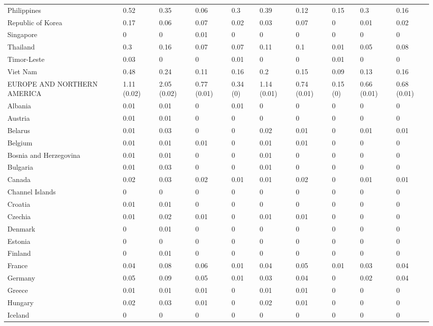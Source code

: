 \begin{longtable}[t]{llllllllll}
Philippines & 0.52 & 0.35 & 0.06 & 0.3 & 0.39 & 0.12 & 0.15 & 0.3 & 0.16\\
Republic of Korea & 0.17 & 0.06 & 0.07 & 0.02 & 0.03 & 0.07 & 0 & 0.01 & 0.02\\
Singapore & 0 & 0 & 0.01 & 0 & 0 & 0 & 0 & 0 & 0\\
Thailand & 0.3 & 0.16 & 0.07 & 0.07 & 0.11 & 0.1 & 0.01 & 0.05 & 0.08\\
Timor-Leste & 0.03 & 0 & 0 & 0.01 & 0 & 0 & 0.01 & 0 & 0\\
Viet Nam & 0.48 & 0.24 & 0.11 & 0.16 & 0.2 & 0.15 & 0.09 & 0.13 & 0.16\\
EUROPE AND NORTHERN AMERICA & 1.11 (0.02) & 2.05 (0.02) & 0.77 (0.01) & 0.34 (0) & 1.14 (0.01) & 0.74 (0.01) & 0.15 (0) & 0.66 (0.01) & 0.68 (0.01)\\
Albania & 0.01 & 0.01 & 0 & 0.01 & 0 & 0 & 0 & 0 & 0\\
Austria & 0.01 & 0.01 & 0 & 0 & 0 & 0 & 0 & 0 & 0\\
Belarus & 0.01 & 0.03 & 0 & 0 & 0.02 & 0.01 & 0 & 0.01 & 0.01\\
Belgium & 0.01 & 0.01 & 0.01 & 0 & 0.01 & 0.01 & 0 & 0 & 0\\
Bosnia and Herzegovina & 0.01 & 0.01 & 0 & 0 & 0.01 & 0 & 0 & 0 & 0\\
Bulgaria & 0.01 & 0.03 & 0 & 0 & 0.01 & 0 & 0 & 0 & 0\\
Canada & 0.02 & 0.03 & 0.02 & 0.01 & 0.01 & 0.02 & 0 & 0.01 & 0.01\\
Channel Islands & 0 & 0 & 0 & 0 & 0 & 0 & 0 & 0 & 0\\
Croatia & 0.01 & 0.01 & 0 & 0 & 0 & 0 & 0 & 0 & 0\\
Czechia & 0.01 & 0.02 & 0.01 & 0 & 0.01 & 0.01 & 0 & 0 & 0\\
Denmark & 0 & 0.01 & 0 & 0 & 0 & 0 & 0 & 0 & 0\\
Estonia & 0 & 0 & 0 & 0 & 0 & 0 & 0 & 0 & 0\\
Finland & 0 & 0.01 & 0 & 0 & 0 & 0 & 0 & 0 & 0\\
France & 0.04 & 0.08 & 0.06 & 0.01 & 0.04 & 0.05 & 0.01 & 0.03 & 0.04\\
Germany & 0.05 & 0.09 & 0.05 & 0.01 & 0.03 & 0.04 & 0 & 0.02 & 0.04\\
Greece & 0.01 & 0.01 & 0.01 & 0 & 0.01 & 0.01 & 0 & 0 & 0\\
Hungary & 0.02 & 0.03 & 0.01 & 0 & 0.02 & 0.01 & 0 & 0 & 0\\
Iceland & 0 & 0 & 0 & 0 & 0 & 0 & 0 & 0 & 0\\

\end{longtable}
